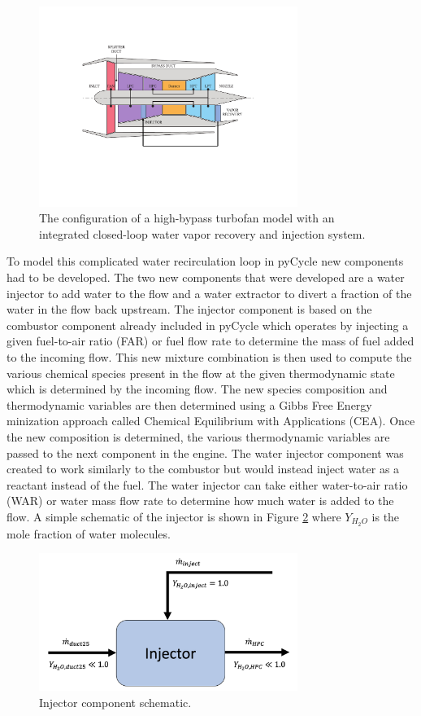 \documentclass[12pt]{new-aiaa}
\begin{document}
\begin{figure}[!hbt]
    \centering
    \includegraphics[width=0.75\textwidth]{turbofan_wvr.pdf}
    \caption{The configuration of a high-bypass turbofan model with an integrated closed-loop water vapor recovery and injection system.}
    \label{fig:hbtf_cycle}
\end{figure}

\noindent
To model this complicated water recirculation loop in pyCycle new components had to be developed.
The two new components that were developed are a water injector to add water to the flow and a water extractor to divert a fraction of the water in the flow back upstream.
The injector component is based on the combustor component already included in pyCycle which operates by injecting a given fuel-to-air ratio (FAR) or fuel flow rate to determine the mass of fuel added to the incoming flow.
This new mixture combination is then used to compute the various chemical species present in the flow at the given thermodynamic state which is determined by the incoming flow.
The new species composition and thermodynamic variables are then determined using a Gibbs Free Energy minization approach called Chemical Equilibrium with Applications (CEA).
Once the new composition is determined, the various thermodynamic variables are passed to the next component in the engine.
The water injector component was created to work similarly to the combustor but would instead inject water as a reactant instead of the fuel.
The water injector can take either water-to-air ratio (WAR) or water mass flow rate to determine how much water is added to the flow.
A simple schematic of the injector is shown in Figure \ref{fig:injector} where $Y_{H_2O}$ is the mole fraction of water molecules.

\begin{figure}[!hbt]
    \centering
    \includegraphics[width=0.75\textwidth]{injector.png}
    \caption{Injector component schematic.}
    \label{fig:injector}
\end{figure}
\end{document}
